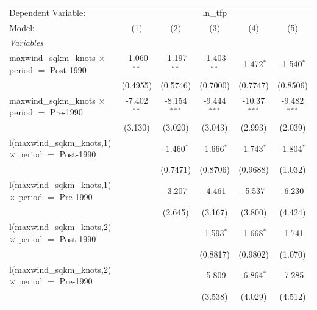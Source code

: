 
\begingroup
\centering
\begin{tabular}{lccccc}
   \tabularnewline \midrule \midrule
   Dependent Variable: & \multicolumn{5}{c}{ln\_tfp}\\
   Model:                                                     & (1)           & (2)            & (3)            & (4)            & (5)\\  
   \midrule
   \emph{Variables}\\
   maxwind\_sqkm\_knots $\times$ period $=$ Post-1990         & -1.060$^{**}$ & -1.197$^{**}$  & -1.403$^{**}$  & -1.472$^{*}$   & -1.540$^{*}$\\   
                                                              & (0.4955)      & (0.5746)       & (0.7000)       & (0.7747)       & (0.8506)\\   
   maxwind\_sqkm\_knots $\times$ period $=$ Pre-1990          & -7.402$^{**}$ & -8.154$^{***}$ & -9.444$^{***}$ & -10.37$^{***}$ & -9.482$^{***}$\\   
                                                              & (3.130)       & (3.020)        & (3.043)        & (2.993)        & (2.039)\\   
   l(maxwind\_sqkm\_knots,1) $\times$ period $=$ Post-1990    &               & -1.460$^{*}$   & -1.666$^{*}$   & -1.743$^{*}$   & -1.804$^{*}$\\   
                                                              &               & (0.7471)       & (0.8706)       & (0.9688)       & (1.032)\\   
   l(maxwind\_sqkm\_knots,1) $\times$ period $=$ Pre-1990     &               & -3.207         & -4.461         & -5.537         & -6.230\\   
                                                              &               & (2.645)        & (3.167)        & (3.800)        & (4.424)\\   
   l(maxwind\_sqkm\_knots,2) $\times$ period $=$ Post-1990    &               &                & -1.593$^{*}$   & -1.668$^{*}$   & -1.741\\   
                                                              &               &                & (0.8817)       & (0.9802)       & (1.070)\\   
   l(maxwind\_sqkm\_knots,2) $\times$ period $=$ Pre-1990     &               &                & -5.809         & -6.864$^{*}$   & -7.285\\   
                                                              &               &                & (3.538)        & (4.029)        & (4.512)\\   

\end{tabular}
